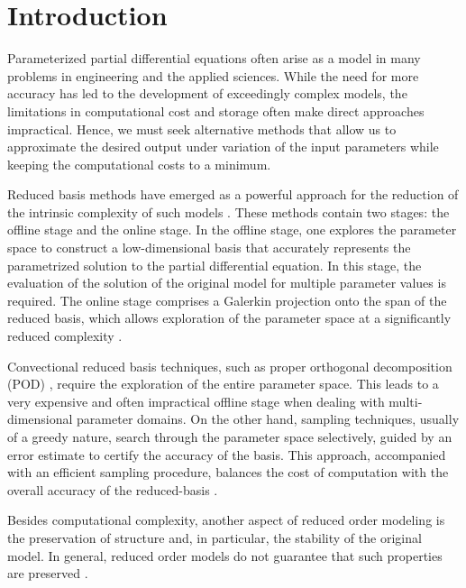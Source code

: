 \section{Introduction}
{\edit Parameterized partial differential equations often arise as a model in many problems in engineering and the applied sciences}. While the need for more accuracy has led to the development of exceedingly complex models, the {\edit limitations in computational cost and storage} often make direct approaches {\edit impractical}. Hence, we must seek alternative methods that allow us to approximate the desired output under variation of the input parameters while keeping the computational costs to a minimum.

Reduced basis methods have emerged as a powerful approach for the reduction of the intrinsic complexity of such models \cite{Ito:1998up,Ito:1998ch,Ito:2001ev,Peterson:1989ki}. These methods contain two stages: {\edit the offline stage and the online stage}. In the offline stage, one explores the parameter space to construct a low-dimensional basis that accurately represents the parametrized solution to the partial differential equation. In this stage, the evaluation of the solution of the original model for multiple parameter values is required. The online stage comprises a Galerkin projection onto the span of the reduced basis, which allows exploration of the parameter space at a significantly reduced complexity \cite{Antoulas:2005:ALD:1088857,Anonymous:2016wl}.

Convectional reduced basis techniques, such as proper orthogonal decomposition (POD) \cite{Kunisch:2002er,Atwell:2001ja,Ravindran:2002hn}, require the exploration of the entire parameter space. This leads to a very expensive and often impractical offline {\edit stage} when dealing with multi-dimensional parameter domains. On the other hand, sampling techniques, usually of a greedy nature, search through the parameter space selectively, guided by an error estimate to certify the accuracy of the basis. This approach, accompanied with an efficient sampling procedure, {\edit balances the cost} of computation with the overall accuracy of the reduced-basis \cite{Cuong:2005gd,Rozza:2005ie,Anonymous:2016wl}.

{\edit Besides} computational complexity, another aspect of reduced order modeling is the preservation of structure and, in particular, {\edit the} stability of the original model. In general, reduced order models do not guarantee that such properties are preserved \cite{Anonymous:pMn0O0Q4}. 

